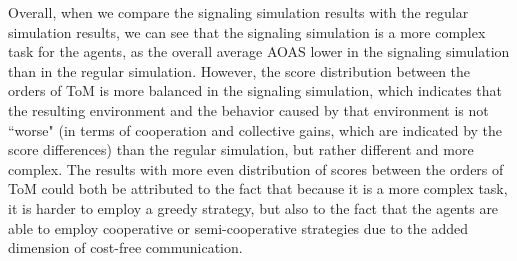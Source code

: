 Overall, when we compare the signaling simulation results with the regular simulation results, we can see that the signaling simulation is a more complex task for the agents, as the overall average AOAS lower in the signaling simulation than in the regular simulation. However, the score distribution between the orders of ToM is more balanced in the signaling simulation, which indicates that the resulting environment and the behavior caused by that environment is not ``worse" (in terms of cooperation and collective gains, which are indicated by the score differences) than the regular simulation, but rather different and more complex. The results with more even distribution of scores between the orders of ToM could both be attributed to the fact that because it is a more complex task, it is harder to employ a greedy strategy, but also to the fact that the agents are able to employ cooperative or semi-cooperative strategies due to the added dimension of cost-free communication. 